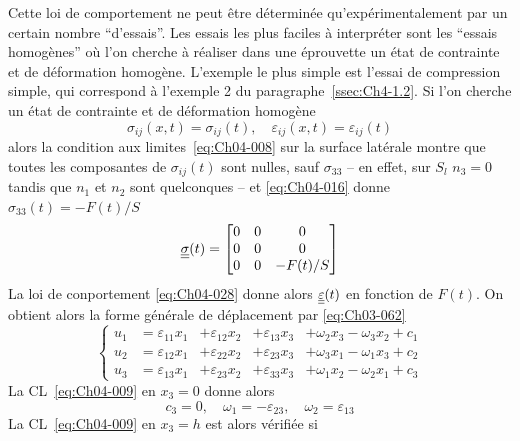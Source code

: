 Cette loi de comportement ne peut être déterminée qu'expérimentale­ment par un certain nombre ``d'essais''.
Les essais les plus faciles à interpréter sont les ``essais homogènes'' où l'on cherche à réaliser dans une éprouvette un état de contrainte et de déformation homogène.
L'exemple le plus simple est l'essai de compression simple, qui correspond à l'exemple 2 du paragraphe~\ref{ssec:Ch4-1.2}.
Si l'on cherche un état de contrainte et de déformation homogène
\begin{equation}
    \sigma_{ij} (x,t) = \sigma_{ij}(t), \quad \varepsilon_{ij}(x,t) = \varepsilon_{ij}(t)
    \label{eq:Ch04-029}
\end{equation}
alors la condition aux limites~\eqref{eq:Ch04-008} sur la surface latérale montre que toutes les composantes de $\sigma_{ij}(t)$ sont nulles, sauf $\sigma_{33}$ -- en effet, sur $S_l$ $n_3=0$ tandis que $n_1$ et $n_2$ sont quelconques -- et \eqref{eq:Ch04-016} donne $\sigma_{33}(t)=-F(t)/S$
\begin{equation}
    \underline{\underline{\sigma}}(t) = \begin{bmatrix}
        0 & 0 & 0 \\
        0 & 0 & 0 \\
        0 & 0 & -F(t)/S
    \end{bmatrix}
    \label{eq:Ch04-030}
\end{equation}
La loi de conportement \eqref{eq:Ch04-028} donne alors $\underline{\underline{\varepsilon}}(t)$ en fonction de $F(t)$.
On obtient alors la forme générale de déplacement par \eqref{eq:Ch03-062}
\begin{equation}
    \left\{
    \begin{aligned}
        u_1 &= \varepsilon_{11} x_1 &+ \varepsilon_{12}x_2 &+ \varepsilon_{13}x_3 &+ \omega_{2}x_3 - \omega_{3} x_2 +c_1\\
        u_2 &= \varepsilon_{12} x_1 &+ \varepsilon_{22}x_2 &+ \varepsilon_{23}x_3 &+ \omega_{3}x_1 - \omega_{1} x_3 +c_2\\
        u_3 &= \varepsilon_{13} x_1 &+ \varepsilon_{23}x_2 &+ \varepsilon_{33}x_3 &+ \omega_{1}x_2 - \omega_{2} x_1 +c_3
    \end{aligned}
    \right.
    \label{eq:Ch04-031}
\end{equation}
La CL~\eqref{eq:Ch04-009} en $x_3 =0$ donne alors
\begin{equation*}
    c_3 = 0, \quad \omega_1 = -\varepsilon_{23}, \quad \omega_2 = \varepsilon_{13}
\end{equation*}
La CL~\eqref{eq:Ch04-009}  en $x_3=h$ est alors vérifiée si

